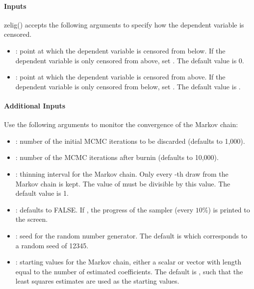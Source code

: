 \documentclass[letterpaper,10pt,english]{sphinxmanual}
\begin{document}
\paragraph{Inputs}
\label{zelig-tobitbayes:inputs}
zelig() accepts the following arguments to specify how the dependent
variable is censored.
\begin{itemize}
\item {} 
: point at which the dependent variable is censored from
below. If the dependent variable is only censored from above, set
. The default value is 0.

\item {} 
: point at which the dependent variable is censored from
above. If the dependent variable is only censored from below, set
. The default value is .

\end{itemize}


\paragraph{Additional Inputs}
\label{zelig-tobitbayes:additional-inputs}
Use the following arguments to monitor the convergence of the Markov
chain:
\begin{itemize}
\item {} 
: number of the initial MCMC iterations to be discarded
(defaults to 1,000).

\item {} 
: number of the MCMC iterations after burnin (defaults to
10,000).

\item {} 
: thinning interval for the Markov chain. Only every
-th draw from the Markov chain is kept. The value of 
must be divisible by this value. The default value is 1.

\item {} 
: defaults to FALSE. If , the progress of the
sampler (every \(10\%\)) is printed to the screen.

\item {} 
: seed for the random number generator. The default is 
which corresponds to a random seed of 12345.

\item {} 
: starting values for the Markov chain, either a scalar
or vector with length equal to the number of estimated coefficients.
The default is , such that the least squares estimates are used
as the starting values.

\end{itemize}
\end{document}
